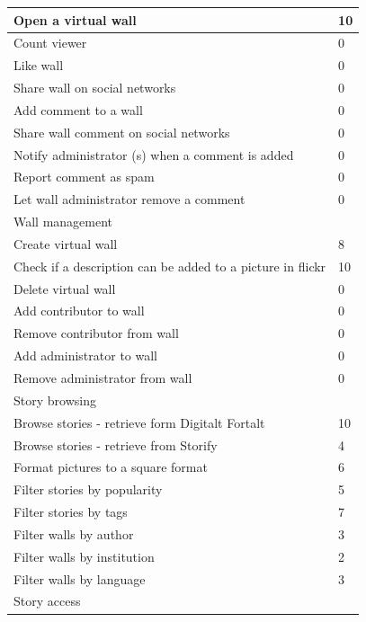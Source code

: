\documentclass[11pt]{book}
\begin{document}
\begin{center}
\begin{longtable}{| l | l |}
        \hline
        Open a virtual wall & 10\\
        \hline
        Count viewer & 0\\
        \hline
        Like wall & 0\\
        \hline
        Share wall on social networks & 0\\
        \hline
        Add comment to a wall & 0\\
        \hline
        Share wall comment on social networks & 0\\
        \hline
        Notify administrator (s) when a comment is added & 0\\
        \hline
        Report comment as spam & 0\\
        \hline
        Let wall administrator remove a comment & 0\\
        \hline
        Wall management & \\
        \hline
        Create virtual wall & 8\\
        \hline
        Check if a description can be added to a picture in flickr & 10\\
        \hline
        Delete virtual wall & 0\\
        \hline
        Add contributor to wall & 0\\
        \hline
        Remove contributor from wall & 0\\
        \hline
        Add administrator to wall & 0\\
        \hline
        Remove administrator from wall & 0\\
        \hline    
        Story browsing & \\
        \hline
        Browse stories - retrieve form Digitalt Fortalt & 10\\
        \hline
        Browse stories - retrieve from Storify & 4\\
        \hline
        Format pictures to a square format & 6\\
        \hline
        Filter stories by popularity & 5\\
        \hline
        Filter stories by tags & 7\\
        \hline    
        Filter walls by author & 3\\
        \hline
        Filter walls by institution & 2\\
        \hline
        Filter walls by language & 3\\
        \hline
        Story access & \\

\end{longtable}
\end{center}
\end{document}
